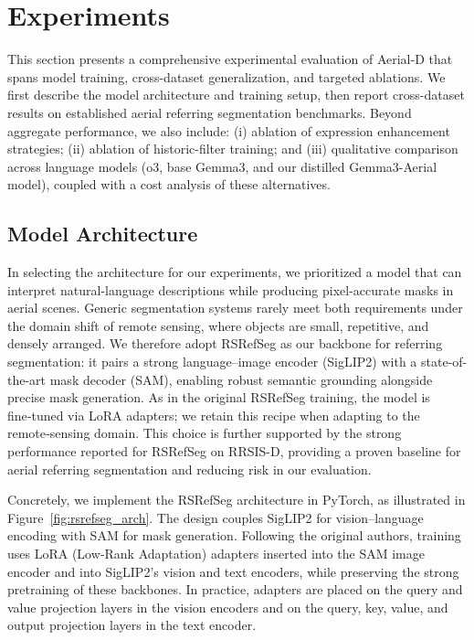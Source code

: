 
\section{Experiments}
\label{sec:experiments}

This section presents a comprehensive experimental evaluation of Aerial-D that spans model training, cross-dataset generalization, and targeted ablations. We first describe the model architecture and training setup, then report cross-dataset results on established aerial referring segmentation benchmarks. Beyond aggregate performance, we also include: (i) ablation of expression enhancement strategies; (ii) ablation of historic-filter training; and (iii) qualitative comparison across language models (o3, base Gemma3, and our distilled Gemma3-Aerial model), coupled with a cost analysis of these alternatives.

\subsection{Model Architecture}
\label{subsec:model_architecture}

In selecting the architecture for our experiments, we prioritized a model that can interpret natural-language descriptions while producing pixel-accurate masks in aerial scenes. Generic segmentation systems rarely meet both requirements under the domain shift of remote sensing, where objects are small, repetitive, and densely arranged. We therefore adopt RSRefSeg as our backbone for referring segmentation: it pairs a strong language–image encoder (SigLIP2) with a state-of-the-art mask decoder (SAM), enabling robust semantic grounding alongside precise mask generation. As in the original RSRefSeg training, the model is fine‑tuned via LoRA adapters; we retain this recipe when adapting to the remote‑sensing domain. This choice is further supported by the strong performance reported for RSRefSeg on RRSIS-D\cite{liu2024rotated}, providing a proven baseline for aerial referring segmentation and reducing risk in our evaluation.

Concretely, we implement the RSRefSeg architecture\cite{chen2025rsrefseg} in PyTorch, as illustrated in Figure~\ref{fig:rsrefseg_arch}. The design couples SigLIP2\cite{siglip2} for vision–language encoding with SAM\cite{sam} for mask generation. Following the original authors, training uses LoRA (Low‑Rank Adaptation)\cite{lora} adapters inserted into the SAM image encoder and into SigLIP2’s vision and text encoders, while preserving the strong pretraining of these backbones. In practice, adapters are placed on the query and value projection layers in the vision encoders and on the query, key, value, and output projection layers in the text encoder.

